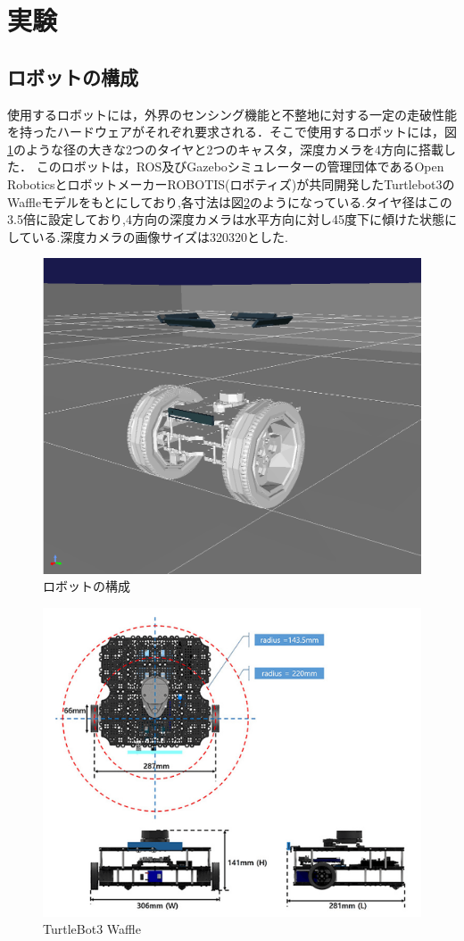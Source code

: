\newpage
\section{実験}
\label{sec:method2}


\subsection{ロボットの構成}
使用するロボットには，外界のセンシング機能と不整地に対する一定の走破性能を持ったハードウェアがそれぞれ要求される．そこで使用するロボットには，図\ref{fig:fig}のような径の大きな2つのタイヤと2つのキャスタ，深度カメラを4方向に搭載した．
このロボットは，ROS及びGazeboシミュレーターの管理団体であるOpen RoboticsとロボットメーカーROBOTIS(ロボティズ)が共同開発したTurtlebot3\cite{bunken4}のWaffleモデルをもとにしており,各寸法は図\ref{fig:turtlebot}のようになっている.タイヤ径はこの3.5倍に設定しており,4方向の深度カメラは水平方向に対し45度下に傾けた状態にしている.深度カメラの画像サイズは320\times320とした.

\begin{figure}[htbp]
  \begin{center}
   \includegraphics[width=0.4\linewidth]{images/robot_visual.png}
   \caption{ロボットの構成}
   \label{fig:fig}
  \end{center}
 \end{figure}


\begin{figure}[htbp]
  \begin{center}
   \includegraphics[width=0.7\linewidth]{images/turtlebot.png}
   \caption{TurtleBot3 Waffle}
   \label{fig:turtlebot}
  \end{center}
 \end{figure}

